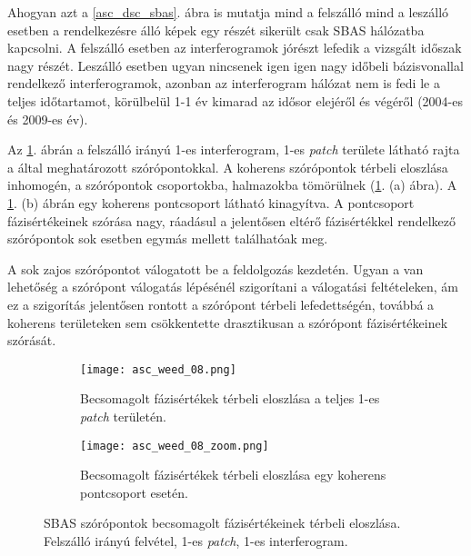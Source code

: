\documentclass[12pt]{report}
\numberwithin{equation}{section}
\numberwithin{table}{section}
\numberwithin{figure}{section}
\begin{document}
Ahogyan azt a \ref{asc_dsc_sbas}. ábra is mutatja mind a felszálló mind a leszálló esetben a rendelkezésre álló képek egy részét sikerült csak SBAS hálózatba kapcsolni. A felszálló esetben az interferogramok jórészt lefedik a vizsgált időszak nagy részét. Leszálló esetben ugyan nincsenek igen igen nagy időbeli bázisvonallal rendelkező interferogramok, azonban az interferogram hálózat nem is fedi le a teljes időtartamot, körülbelül 1-1 év kimarad az idősor elejéről és végéről (2004-es és 2009-es év).

Az \ref{wrapped}. ábrán a felszálló irányú 1-es interferogram, 1-es \textit{patch} területe látható rajta a \stamps által meghatározott szórópontokkal. A koherens szórópontok térbeli eloszlása inhomogén, a szórópontok csoportokba, halmazokba tömörülnek (\ref{wrapped}. (a) ábra). A \ref{wrapped}. (b) ábrán egy koherens pontcsoport látható kinagyítva. A pontcsoport fázisértékeinek szórása nagy, ráadásul a jelentősen eltérő fázisértékkel rendelkező szórópontok sok esetben egymás mellett találhatóak meg.

A \stamps sok zajos szórópontot válogatott be a feldolgozás kezdetén. Ugyan a van lehetőség a szórópont válogatás lépésénél szigorítani a válogatási feltételeken, ám ez a szigorítás jelentősen rontott a szórópont térbeli lefedettségén, továbbá a koherens területeken sem csökkentette drasztikusan a szórópont fázisértékeinek szórását.

\begin{center}
    \begin{figure}[H]
        \begin{subfigure}[t]{.49\linewidth}
            \centering
            \texttt{[image: asc\_weed\_08.png]}
            \caption{Becsomagolt fázisértékek térbeli eloszlása a teljes 1-es \textit{patch} területén.}
        \end{subfigure}
        \hspace{10pt}
        \begin{subfigure}[t]{.49\linewidth}
            \centering
            \texttt{[image: asc\_weed\_08\_zoom.png]}
            \caption{Becsomagolt fázisértékek térbeli eloszlása egy koherens pontcsoport esetén.}
        \end{subfigure}
    \caption{SBAS szórópontok becsomagolt fázisértékeinek térbeli eloszlása. Felszálló irányú felvétel, 1-es \textit{patch}, 1-es interferogram.}\label{wrapped}
    \end{figure}
\end{center}
\end{document}
